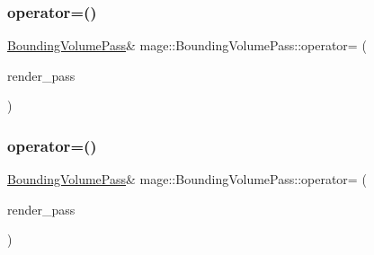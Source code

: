 \hypertarget{classmage_1_1_bounding_volume_pass_a2115e9af06e0bc7e42fc95e10f0dacad}{}\label{classmage_1_1_bounding_volume_pass_a2115e9af06e0bc7e42fc95e10f0dacad} 
\subsubsection{\texorpdfstring{operator=()}{operator=()}\hspace{0.1cm}{\footnotesize\ttfamily [1/2]}}
{\footnotesize\ttfamily \hyperlink{classmage_1_1_bounding_volume_pass}{Bounding\+Volume\+Pass}\& mage\+::\+Bounding\+Volume\+Pass\+::operator= (\begin{DoxyParamCaption}\item[{const \hyperlink{classmage_1_1_bounding_volume_pass}{Bounding\+Volume\+Pass} \&}]{render\+\_\+pass }\end{DoxyParamCaption})\hspace{0.3cm}{\ttfamily [delete]}}

\hypertarget{classmage_1_1_bounding_volume_pass_a3887d5ffbb5e175187004f0b057ddcaa}{}\label{classmage_1_1_bounding_volume_pass_a3887d5ffbb5e175187004f0b057ddcaa} 
\subsubsection{\texorpdfstring{operator=()}{operator=()}\hspace{0.1cm}{\footnotesize\ttfamily [2/2]}}
{\footnotesize\ttfamily \hyperlink{classmage_1_1_bounding_volume_pass}{Bounding\+Volume\+Pass}\& mage\+::\+Bounding\+Volume\+Pass\+::operator= (\begin{DoxyParamCaption}\item[{\hyperlink{classmage_1_1_bounding_volume_pass}{Bounding\+Volume\+Pass} \&\&}]{render\+\_\+pass }\end{DoxyParamCaption})\hspace{0.3cm}{\ttfamily [delete]}}

\hypertarget{classmage_1_1_bounding_volume_pass_a56957ab48a5ab958d12f02c357881113}{}\label{classmage_1_1_bounding_volume_pass_a56957ab48a5ab958d12f02c357881113} 
